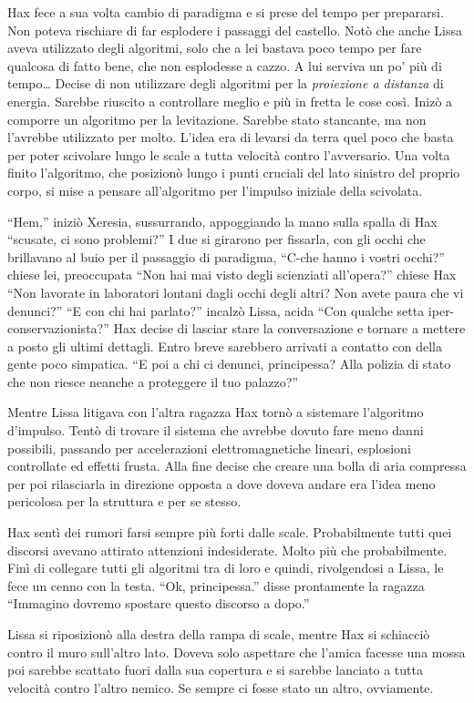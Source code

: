     Hax fece a sua volta cambio di paradigma e si prese del tempo per
    prepararsi. Non poteva rischiare di far esplodere i passaggi del
    castello. Notò che anche Lissa aveva utilizzato degli algoritmi, solo
    che a lei bastava poco tempo per fare qualcosa di fatto bene, che non
    esplodesse a cazzo. A lui serviva un po' più di tempo\dots{} Decise di
    non utilizzare degli algoritmi per la \emph{proiezione a distanza} di
    energia. Sarebbe riuscito a controllare meglio e più in fretta le cose
    così. Inizò a comporre un algoritmo per la levitazione. Sarebbe stato
    stancante, ma non l'avrebbe utilizzato per molto. L'idea era di levarsi
    da terra
    quel poco che basta per poter scivolare lungo le scale a tutta velocità
    contro l'avversario. Una volta finito l'algoritmo, che posizionò lungo
    i punti cruciali del lato sinistro del proprio corpo, si mise a pensare
    all'algoritmo per l'impulso iniziale della scivolata. 

    ``Hem,'' iniziò Xeresia, sussurrando, appoggiando la mano sulla spalla
    di Hax ``scusate, ci sono problemi?'' I due si girarono per fissarla,
    con gli occhi che brillavano al buio per il passaggio di paradigma,
    ``C-che hanno i vostri occhi?'' chiese lei, preoccupata ``Non hai mai
    visto degli scienziati all'opera?'' chiese Hax ``Non lavorate in
    laboratori lontani dagli occhi degli altri? Non avete paura che vi
    denunci?'' ``E con chi hai parlato?'' incalzò Lissa, acida ``Con
    qualche setta iper-conservazionista?'' Hax decise di lasciar stare la
    conversazione e tornare a mettere a posto gli ultimi dettagli. Entro
    breve sarebbero arrivati a contatto con della gente poco simpatica. ``E
    poi a chi ci denunci, principessa? Alla polizia di stato che non riesce
    neanche a proteggere il tuo palazzo?''

    Mentre Lissa litigava con l'altra ragazza Hax tornò a sistemare
    l'algoritmo d'impulso. Tentò di trovare il sistema che avrebbe dovuto
    fare meno danni possibili, passando per accelerazioni elettromagnetiche
    lineari, esplosioni controllate ed effetti frusta. Alla fine decise che
    creare una bolla di aria compressa per poi rilasciarla in direzione
    opposta a dove doveva andare era l'idea meno pericolosa per la
    struttura e per se stesso.

    Hax sentì dei rumori farsi sempre più forti dalle scale. Probabilmente
    tutti quei discorsi avevano attirato attenzioni indesiderate. Molto più
    che probabilmente. Finì di collegare tutti gli algoritmi tra di loro e quindi,
    rivolgendosi a Lissa, le fece un cenno con la testa. ``Ok,
    principessa.'' disse prontamente la ragazza ``Immagino dovremo spostare
    questo discorso a dopo.''

    Lissa si riposizionò alla destra della rampa di scale, mentre Hax si
    schiacciò contro il muro sull'altro lato. Doveva solo aspettare che
    l'amica facesse una mossa poi sarebbe scattato fuori dalla sua
    copertura e si sarebbe lanciato a tutta velocità contro l'altro nemico.
    Se sempre ci fosse stato un altro, ovviamente. 
\cleardoublepage{}
